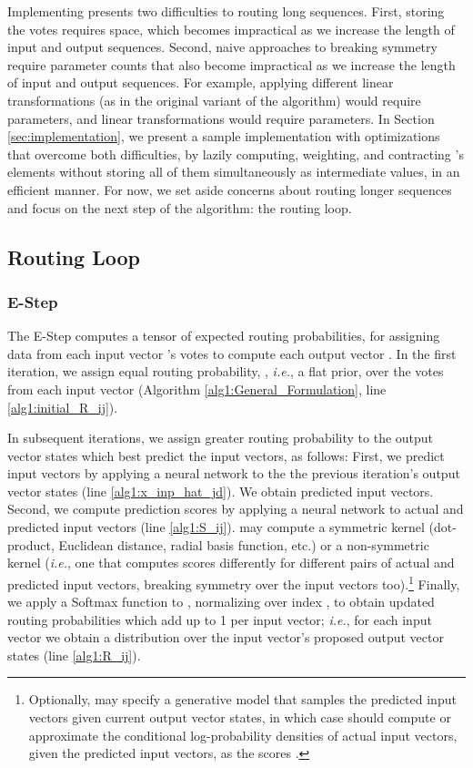 \documentclass[11pt,a4paper]{article}
\begin{document}
Implementing  presents two difficulties to routing long sequences. First, storing the votes  requires  space, which becomes impractical as we increase the length of input and output sequences. Second, naive approaches to breaking symmetry require parameter counts that also become impractical as we increase the length of input and output sequences. For example, applying  different linear transformations (as in the original variant of the algorithm) would require  parameters, and  linear transformations would require  parameters. In Section \ref{sec:implementation}, we present a sample implementation with optimizations that overcome both difficulties, by lazily computing, weighting, and contracting 's elements without storing all of them simultaneously as intermediate values, in an efficient manner. For now, we set aside concerns about routing longer sequences and focus on the next step of the algorithm: the routing loop.


\subsection{Routing Loop}\label{ssec:routing_iterations}

\subsubsection{E-Step}\label{sssec:E_Step}

The E-Step computes a tensor  of expected routing probabilities, for assigning data from each input vector 's votes to compute each output vector . In the first iteration, we assign equal routing probability, , {\em i.e.}, a flat prior, over the votes from each input vector (Algorithm \ref{alg1:General_Formulation}, line \ref{alg1:initial_R_ij}).

In subsequent iterations, we assign greater routing probability to the output vector states which best predict the input vectors, as follows: First, we predict input vectors by applying a neural network  to the the previous iteration's output vector states (line \ref{alg1:x_inp_hat_jd}). We obtain  predicted input vectors. Second, we compute prediction scores  by applying a neural network  to actual and predicted input vectors (line \ref{alg1:S_ij}).  may compute a symmetric kernel (dot-product, Euclidean distance, radial basis function, etc.) or a non-symmetric kernel ({\em i.e.}, one that computes scores differently for different pairs of actual and predicted input vectors, breaking symmetry over the input vectors too).\footnote{
	Optionally,  may specify a generative model that samples the predicted input vectors given current output vector states, in which case  should compute or approximate the conditional log-probability densities of actual input vectors, given the predicted input vectors, as the scores .
} Finally, we apply a Softmax function to , normalizing over index , to obtain updated routing probabilities  which add up to 1 per input vector; {\em i.e.}, for each input vector  we obtain a distribution over the input vector's proposed output vector states  (line \ref{alg1:R_ij}).
\end{document}
